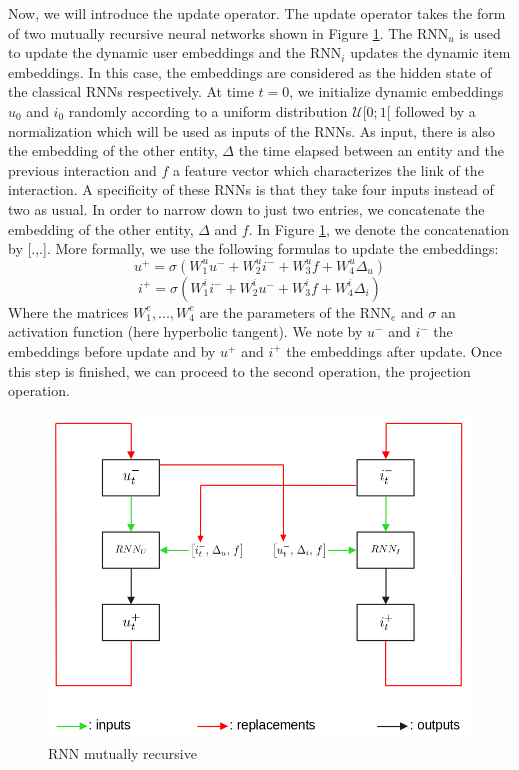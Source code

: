 Now, we will introduce the update operator. The update operator takes the form of two mutually recursive neural networks shown in Figure \ref{recursive RNNs}. The RNN$_u$ is used to update the dynamic user embeddings and the RNN$_i$ updates the dynamic item embeddings. In this case, the embeddings are considered as the hidden state of the classical RNNs respectively. At time $t=0$, we initialize dynamic embeddings $u_0$ and $i_0$ randomly according to a uniform distribution $\mathcal{U}[0;1[$ followed by a normalization which will be used as inputs of the RNNs. As input, there is also the embedding of the other entity, $\Delta$ the time elapsed between an entity and the previous interaction and $f$ a feature vector which characterizes the link of the interaction. A specificity of these RNNs is that they take four inputs instead of two as usual. In order to narrow down to just two entries, we concatenate the embedding of the other entity, $\Delta$ and $f$. In Figure \ref{recursive RNNs}, we denote the concatenation by [.,.]. More formally, we use the following formulas to update the embeddings:
$$
u^+ = \sigma \left ( W_1^u u^- + W_2^u i^- + W_3^u f + W_4^u \Delta_u \right )
$$
$$
i^+ = \sigma \left ( W_1^i i^- + W_2^i u^- + W_3^i f + W_4^i \Delta_i \right )
$$
Where the matrices $W_1^e, ..., W_4^e$ are the parameters of the RNN$_e$ and $\sigma$ an activation function (here hyperbolic tangent). We note by $u^-$ and $i^-$ the embeddings before update and by $u^+$ and $i^+$ the embeddings after update. Once this step is finished, we can proceed to the second operation, the projection operation.

\begin{figure}[H]
   
   \centering
    \includegraphics[scale = 0.4]{image/rnn_mutually.png}
    \caption{RNN mutually recursive}
    \label{recursive RNNs}
\end{figure}

